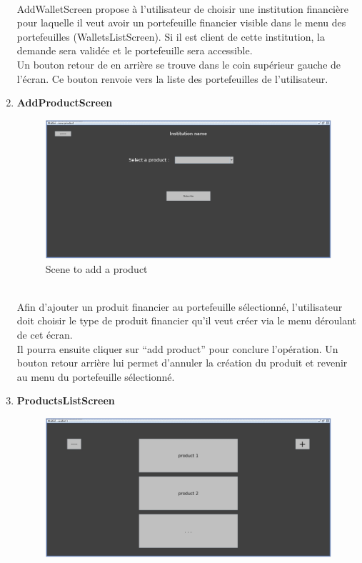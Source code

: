 \documentclass[../rapport.tex]{subfiles}
\begin{document}
\begin{enumerate}
		\\
AddWalletScreen propose à l'utilisateur de choisir une institution financière pour laquelle il veut avoir un portefeuille financier visible dans le menu des portefeuilles (WalletsListScreen). Si il est client de cette institution, la demande sera validée et le portefeuille sera accessible.\\
Un bouton retour de en arrière se trouve dans le coin supérieur gauche de l'écran. Ce bouton renvoie vers la liste des portefeuilles de l'utilisateur.
\newpage
\item \textbf{AddProductScreen}\\
	    \begin{figure}[h!]
			\centering \includegraphics[scale=0.2]{ressources/photos_diagrammes/app1/gui/addproduct.jpg}
			\caption{Scene to add a product}
		\end{figure}
		\\
Afin d'ajouter un produit financier au portefeuille sélectionné, l'utilisateur doit choisir le type de produit financier qu'il veut créer via le menu déroulant de cet écran.\\
Il pourra ensuite cliquer sur ``add product'' pour conclure l'opération. Un bouton retour arrière lui permet d'annuler la création du produit et revenir au menu du portefeuille sélectionné.
\newpage
\item \textbf{ProductsListScreen} \\
		\begin{figure}[h!]
				\centering \includegraphics[scale=0.2]{ressources/photos_diagrammes/app1/gui/productsList.jpg}

\end{figure}
\end{enumerate}
\end{document}
